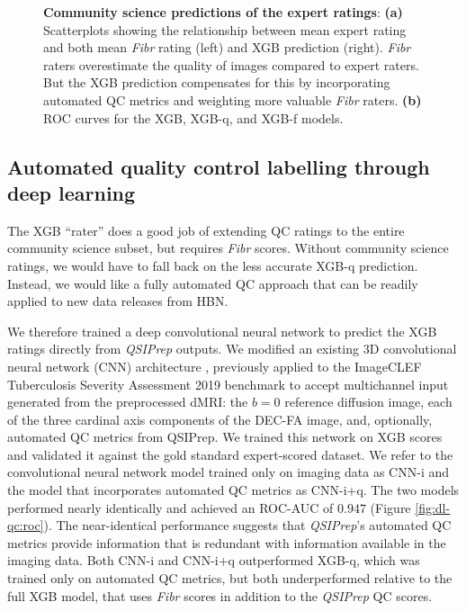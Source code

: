 \documentclass[fleqn,10pt]{wlscirep}
\begin{document}
\begin{figure}[tbp]
\begin{subfigure}{.45\textwidth}
    \caption{}
    \label{fig:fibr-qc:roc}
    \end{subfigure}
    \caption{%
        {\bf Community science predictions of the expert ratings}:
        \textbf{(a)} Scatterplots showing the relationship between mean expert
        rating and both mean \emph{Fibr} rating (left) and XGB prediction
        (right). \emph{Fibr} raters overestimate the quality of images compared
        to expert raters. But the XGB prediction compensates for this by
        incorporating automated QC metrics and weighting more valuable
        \emph{Fibr} raters.
        \textbf{(b)} ROC curves for the XGB, XGB-q, and XGB-f models.
    }
    \label{fig:fibr-qc}
\end{figure}

\subsection*{Automated quality control labelling through deep learning}

The XGB ``rater'' does a good job of extending QC ratings to the entire
community science subset, but requires \emph{Fibr} scores. Without community
science ratings, we would have to fall back on the less accurate XGB-q
prediction. Instead, we would like a fully automated QC approach that can be
readily applied to new data releases from HBN.

We therefore trained a deep convolutional neural network to predict the XGB
ratings directly from \emph{QSIPrep} outputs. We modified an existing 3D
convolutional neural network (CNN) architecture \cite{zunair2020-bs}, previously
applied to the ImageCLEF Tuberculosis Severity Assessment 2019 benchmark
\cite{dicente2019clef} to accept multichannel input generated from the
preprocessed dMRI: the $b=0$ reference diffusion image, each of the three
cardinal axis components of the DEC-FA image, and, optionally, automated QC
metrics from QSIPrep. We trained this network on XGB scores and validated it
against the gold standard expert-scored dataset. We refer to the convolutional
neural network model trained only on imaging data as CNN-i and the model that
incorporates automated QC metrics as CNN-i+q. The two models performed nearly
identically and achieved an ROC-AUC of $0.947$ (Figure \ref{fig:dl-qc:roc}). The
near-identical performance suggests that \emph{QSIPrep}'s automated QC metrics
provide information that is redundant with information available in the imaging
data. Both CNN-i and CNN-i+q outperformed XGB-q, which was trained only on
automated QC metrics, but both underperformed relative to the full XGB model,
that uses \emph{Fibr} scores in addition to the \emph{QSIPrep} QC scores.
\end{document}
